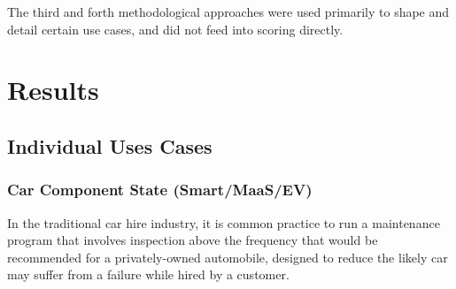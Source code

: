 \documentclass[journal]{IEEEtran}
\begin{document}
The third and forth methodological approaches were used primarily to
shape and detail certain use cases, and did not feed into scoring
directly.

\section{Results}





\subsection{Individual Uses Cases}

\subsubsection{Car Component State (Smart/MaaS/EV)}

In the traditional car hire industry, it is common practice to run a
maintenance program that involves inspection above the frequency that
would be recommended for a privately-owned automobile, designed to
reduce the likely car may suffer from a failure while hired by a
customer.
\end{document}
